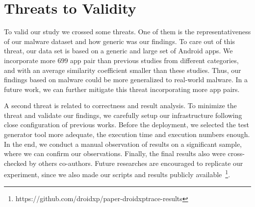 \section{Threats to Validity}\label{sec:threats}

To valid our study we crossed some threats. One of them is the representativeness of our malware dataset and how generic was our findings. To care out of this threat, our data set is based on a generic and large set of Android apps. We incorporate more $699$ app pair than previous studies from different categories, and with an average similarity coefficient smaller than these studies. Thus, our findings based on malware could be more generalized to real-world malware. In a future work, we can further mitigate this threat incorporating more app pairs.

A second threat is related to correctness and result analysis. To minimize the threat and validate our findings, we carefully setup our infrastructure following close configuration of previous works. Before the deployment, we selected the test generator tool more adequate, the execution time and execution numbers enough. In the end, we conduct a manual observation of results on a significant sample, where we can confirm our observations. Finally, the final results also were cross-checked by others co-authors. Future researches are encouraged to replicate our experiment, since we also made our scripts and results publicly available~\footnote{ https://github.com/droidxp/paper-droidxptrace-results}.